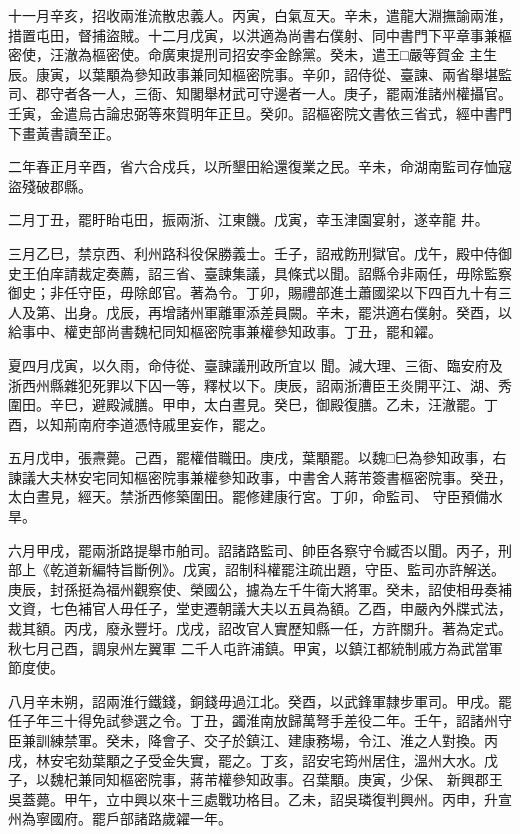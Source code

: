 \begin{pinyinscope}
 十一月辛亥，招收兩淮流散忠義人。丙寅，白氣亙天。辛未，遣龍大淵撫諭兩淮，措置屯田，督捕盜賊。十二月戊寅，以洪適為尚書右僕射、同中書門下平章事兼樞密使，汪澈為樞密使。命廣東提刑司招安李金餘黨。癸未，遣王□嚴等賀金
 主生辰。康寅，以葉顒為參知政事兼同知樞密院事。辛卯，詔侍從、臺諫、兩省舉堪監司、郡守者各一人，三衙、知閣舉材武可守邊者一人。庚子，罷兩淮諸州權攝官。壬寅，金遣烏古論忠弼等來賀明年正旦。癸卯。詔樞密院文書依三省式，經中書門下畫黃書讀至正。



 二年春正月辛酉，省六合戍兵，以所墾田給還復業之民。辛未，命湖南監司存恤寇盜殘破郡縣。



 二月丁丑，罷盱眙屯田，振兩浙、江東饑。戊寅，幸玉津園宴射，遂幸龍
 井。



 三月乙巳，禁京西、利州路科役保勝義士。壬子，詔戒飭刑獄官。戊午，殿中侍御史王伯庠請裁定奏薦，詔三省、臺諫集議，具條式以聞。詔縣令非兩任，毋除監察御史；非任守臣，毋除郎官。著為令。丁卯，賜禮部進土蕭國梁以下四百九十有三人及第、出身。戊辰，再增諸州軍離軍添差員闕。辛未，罷洪適右僕射。癸酉，以給事中、權吏部尚書魏杞同知樞密院事兼權參知政事。丁丑，罷和糴。



 夏四月戊寅，以久雨，命侍從、臺諫議刑政所宜以
 聞。減大理、三衙、臨安府及浙西州縣雜犯死罪以下囚一等，釋杖以下。庚辰，詔兩浙漕臣王炎開平江、湖、秀圍田。辛巳，避殿減膳。甲申，太白晝見。癸巳，御殿復膳。乙未，汪澈罷。丁酉，以知荊南府李道憑恃戚里妄作，罷之。



 五月戊申，張燾薨。己酉，罷權借職田。庚戌，葉顒罷。以魏□巳為參知政事，右諫議大夫林安宅同知樞密院事兼權參知政事，中書舍人蔣芾簽書樞密院事。癸丑，太白晝見，經天。禁浙西修築圍田。罷修建康行宮。丁卯，命監司、
 守臣預備水旱。



 六月甲戌，罷兩浙路提舉市舶司。詔諸路監司、帥臣各察守令臧否以聞。丙子，刑部上《乾道新編特旨斷例》。戊寅，詔制科權罷注疏出題，守臣、監司亦許解送。庚辰，封孫挺為福州觀察使、榮國公，攄為左千牛衛大將軍。癸未，詔使相毋奏補文資，七色補官人毋任子，堂吏遷朝議大夫以五員為額。乙酉，申嚴內外牒式法，裁其額。丙戌，廢永豐圩。戊戌，詔改官人實歷知縣一任，方許關升。著為定式。秋七月己酉，調泉州左翼軍
 二千人屯許浦鎮。甲寅，以鎮江都統制戚方為武當軍節度使。



 八月辛未朔，詔兩淮行鐵錢，銅錢毋過江北。癸酉，以武鋒軍隸步軍司。甲戌。罷任子年三十得免試參選之令。丁丑，蠲淮南放歸萬弩手差役二年。壬午，詔諸州守臣兼訓練禁軍。癸未，降會子、交子於鎮江、建康務場，令江、淮之人對換。丙戌，林安宅劾葉顒之子受金失實，罷之。丁亥，詔安宅筠州居住，溫州大水。戊子，以魏杞兼同知樞密院事，蔣芾權參知政事。召葉顒。庚寅，少保、
 新興郡王吳蓋薨。甲午，立中興以來十三處戰功格目。乙未，詔吳璘復判興州。丙申，升宣州為寧國府。罷戶部諸路歲糴一年。




\end{pinyinscope}
